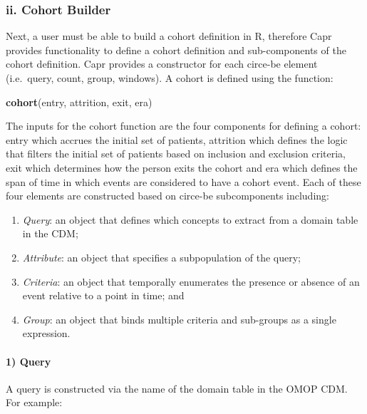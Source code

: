\documentclass[
]{article}
\newenvironment{Shaded}{\begin{snugshade}}{\end{snugshade}}
\newcommand{\FunctionTok}[1]{\textcolor[rgb]{0.13,0.29,0.53}{\textbf{#1}}}
\newcommand{\NormalTok}[1]{#1}
\providecommand{\tightlist}{%
  \setlength{\itemsep}{0pt}\setlength{\parskip}{0pt}}
\begin{document}
\subsubsection{ii. Cohort Builder}\label{ii.-cohort-builder}

Next, a user must be able to build a cohort definition in R, therefore
Capr provides functionality to define a cohort definition and
sub-components of the cohort definition. Capr provides a constructor for
each circe-be element (i.e.~query, count, group, windows). A cohort is
defined using the function:

\begin{Shaded}
\begin{Highlighting}[]
\FunctionTok{cohort}\NormalTok{(entry, attrition, exit, era)}
\end{Highlighting}
\end{Shaded}

The inputs for the cohort function are the four components for defining
a cohort: entry which accrues the initial set of patients, attrition
which defines the logic that filters the initial set of patients based
on inclusion and exclusion criteria, exit which determines how the
person exits the cohort and era which defines the span of time in which
events are considered to have a cohort event. Each of these four
elements are constructed based on circe-be subcomponents including:

\begin{enumerate}
\def\labelenumi{\arabic{enumi})}
\tightlist
\item
  \emph{Query}: an object that defines which concepts to extract from a
  domain table in the CDM;
\item
  \emph{Attribute}: an object that specifies a subpopulation of the
  query;
\item
  \emph{Criteria}: an object that temporally enumerates the presence or
  absence of an event relative to a point in time; and
\item
  \emph{Group}: an object that binds multiple criteria and sub-groups as
  a single expression.
\end{enumerate}

\paragraph{1) Query}\label{query}

A query is constructed via the name of the domain table in the OMOP CDM.
For example:
\end{document}
